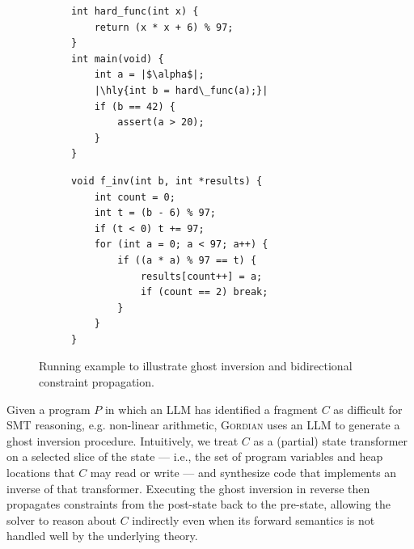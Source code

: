\documentclass[acmsmall,screen,nonacm]{acmart}
\newcommand{\projName}{\textsc{Gordian}\xspace}
\theoremstyle{definition}
\begin{document}
\begin{figure}[t]
  \begin{subfigure}[b]{0.48\textwidth}
    \centering
{\scriptsize          
\begin{verbatim}
int hard_func(int x) { 
    return (x * x + 6) % 97; 
}
int main(void) {
    int a = |$\alpha$|;
    |\hly{int b = hard\_func(a);}|
    if (b == 42) {
        assert(a > 20);
    }
}
\end{verbatim}
}
  \end{subfigure}
  \hfill
  \begin{subfigure}[b]{0.48\textwidth}
    \centering
{\scriptsize          
\begin{verbatim}
void f_inv(int b, int *results) {
    int count = 0;
    int t = (b - 6) % 97;
    if (t < 0) t += 97;
    for (int a = 0; a < 97; a++) {
        if ((a * a) % 97 == t) {
            results[count++] = a;
            if (count == 2) break;
        }
    }
}
\end{verbatim}
}
  \end{subfigure}
  \vspace{-2mm}
  \caption{Running example to illustrate ghost inversion and bidirectional constraint propagation.\label{fig:inversion_running_example}} 
  \vspace{-2mm} 
\end{figure}


Given a program $P$ in which an LLM has identified a fragment $C$ as difficult for SMT reasoning, e.g. non-linear arithmetic, \projName uses an LLM to generate a ghost inversion procedure. Intuitively, we treat $C$ as a (partial) state transformer on a selected slice of the state --- i.e., the set of program variables and heap locations that $C$ may read or write --- and synthesize code that implements an inverse of that transformer. Executing the ghost inversion in reverse then propagates constraints from the post-state back to the pre-state, allowing the solver to reason about $C$ indirectly even when its forward semantics is not handled well by the underlying theory.
\end{document}

